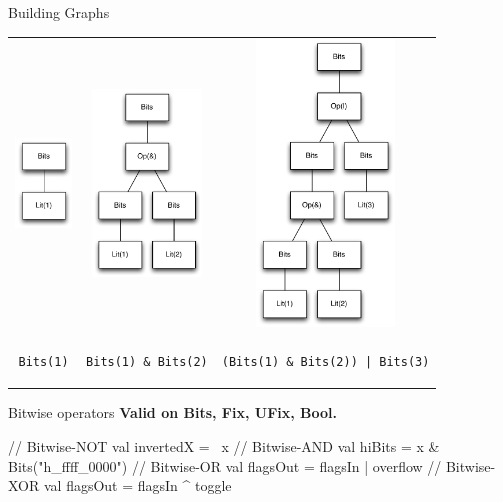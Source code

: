 \documentclass[xcolor=pdflatex,dvipsnames,table]{beamer}
\newcommand{\code}[1]{\begin{footnotesize}{\tt #1}\end{footnotesize}}
\begin{document}
\begin{frame}[fragile]{Building Graphs}
\begin{center}
\begin{tabular}{ccc}
\includegraphics[height=0.94in]{../manual/figs/bits-1.pdf} &
\includegraphics[height=1.96in]{../manual/figs/bits-and.pdf} &
\includegraphics[height=3.0in]{../manual/figs/bits-or-and.pdf} \\
\code{Bits(1)} & \code{Bits(1) \& Bits(2)} &
\code{(Bits(1) \& Bits(2)) | Bits(3)} \\
\end{tabular}
\end{center}
\end{frame}

\begin{frame}[fragile]{Bitwise operators}
\textbf{Valid on Bits, Fix, UFix, Bool.}
\begin{scala}
// Bitwise-NOT
val invertedX = ~x                      
// Bitwise-AND 
val hiBits    = x & Bits("h_ffff_0000") 
// Bitwise-OR
val flagsOut  = flagsIn | overflow      
// Bitwise-XOR
val flagsOut  = flagsIn ^ toggle        
\end{scala}
\end{frame}
\end{document}
